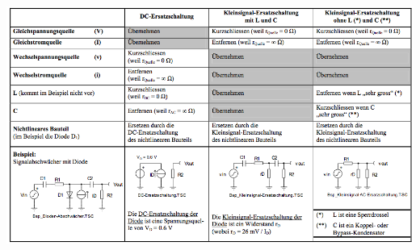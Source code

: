 			
			\begin{minipage}{18cm}
            \includegraphics[width=18cm]{./bilder/dc-kleinsignal-ersatz.png}
            \end{minipage}

